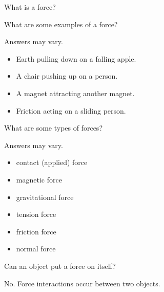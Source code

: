 \documentclass[../main-physics-problems.tex]{subfiles}
\begin{document}
\begin{questions}

\question
What is a force?


\question
What are some examples of a force?

\begin{solution}
    Answers may vary.

    \begin{itemize}[itemsep=0pt]
        \item Earth pulling down on a falling apple. 
        \item A chair pushing up on a person.
        \item A magnet attracting another magnet.
        \item Friction acting on a sliding person.
    \end{itemize}
\end{solution}

\question
What are some types of forces?

\begin{solution}
    Answers may vary.

    \begin{itemize}[itemsep=0pt]
        \item contact (applied) force
        \item magnetic force
        \item gravitational force
        \item tension force
        \item friction force
        \item normal force
    \end{itemize}
\end{solution}

\question
Can an object put a force on itself? %

\begin{solution}
    No. Force interactions occur between two objects.
\end{solution}

\question
{}
\end{questions}
\end{document}
